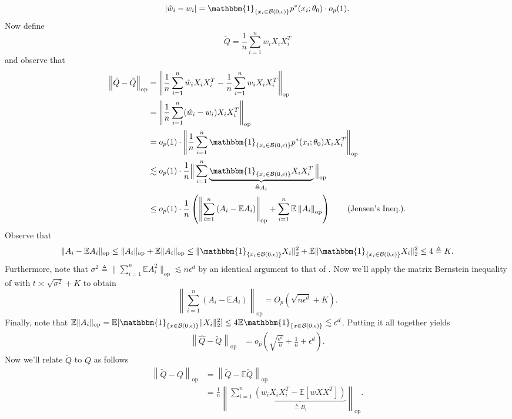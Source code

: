 \documentclass[11pt]{article}
\begin{document}
\begin{equation*}
     |\hat{w}_i - w_i| = \mathbbm{1}_{\{x_i \in \mathcal{B}(0, \epsilon)\}}p^*(x_i;\theta_0) \cdot o_p(1).
\end{equation*}
Now define 
\[\tilde{Q} = \frac{1}{n}\sum_{i = 1}^n w_iX_iX_i^T\]
and observe that 
\begin{align*}
\left\|\hat{Q} - \tilde{Q}\right\|_{\text{op}} &= \left\|\frac{1}{n}\sum_{i = 1}^n\hat{w}_iX_iX_i^T - \frac{1}{n}\sum_{i = 1}^nw_iX_iX_i^T\right\|_{\text{op}} \\
&= \left\|\frac{1}{n}\sum_{i = 1}^n(\hat{w}_i - w_i)X_iX_i^T\right\|_{\text{op}} \\
&= o_p(1) \cdot \left\|\frac{1}{n}\sum_{i = 1}^n\mathbbm{1}_{\{x_i \in \mathcal{B}(0, \epsilon)\}}p^*(x_i;\theta_0)X_iX_i^T\right\|_{\text{op}} \\
&\lesssim  o_p(1) \cdot \frac{1}{n}\Big\|\sum_{i = 1}^n\underbrace{\mathbbm{1}_{\{x_i \in \mathcal{B}(0, \epsilon)\}}X_iX_i^T}_{\triangleq A_i}\Big\|_{\text{op}} \\
&\leq o_p(1) \cdot \frac{1}{n}\left(\left\|\sum_{i = 1}^n\left(A_i - \mathbb{E}A_i\right)\right\|_{\text{op}} + \sum_{i = 1}^n\mathbb{E}\left\|A_i\right\| _{\text{op}}\right)\tag{Jensen's Ineq.} .
\end{align*}
Observe that \[\|A_i - \mathbb{E}A_i\|_{\text{op}} \leq \|A_i\|_{\text{op}} + \mathbb{E}\|A_i\|_{\text{op}} \leq \|\mathbbm{1}_{\{x_i \in \mathcal{B}(0, \epsilon)\}}X_i\|^2_2 + \mathbb{E}\|\mathbbm{1}_{\{x_i \in \mathcal{B}(0, \epsilon)\}}X_i\|_2^2 \leq 4 \triangleq K.\] Furthermore, note that $\sigma^2 \triangleq \|\sum_{i = 1}^n\mathbb{E}A_i^2\|_{\text{op}} \lesssim n\epsilon^d$ by an identical argument to that of . Now we'll apply the matrix Bernstein inequality of  with $t \asymp \sqrt{\sigma^2} + K$ to obtain
\[\left\| \sum_{i = 1}^n \left(A_i - \mathbb{E}A_i\right)\right\|_{\text{op}} = O_p\left(\sqrt{n\epsilon^d}  + K\right).\]
Finally, note that $\mathbb{E}\|A_i\|_{\text{op}} = \mathbb{E}[\mathbbm{1}_{\{x \in \mathcal{B}(0, \epsilon)\}}\|X_i\|_2^2] \leq 4\mathbb{E}\mathbbm{1}_{\{x \in \mathcal{B}(0, \epsilon)\}} \lesssim \epsilon^d$. Putting it all together yields
\begin{align*}
\left\|\hat{Q} - \tilde{Q}\right\|_{\text{op}} &= o_p\left( \sqrt{\frac{\epsilon^d}{n}} + \frac{1}{n} + \epsilon^d \right).
\end{align*}
Now we'll relate $\tilde Q$ to $Q$ as follows
\begin{align*}
    \left\|\tilde{Q} - Q\right\|_{\text{op}} &= \left\|\tilde{Q} - \mathbb{E}\tilde{Q}\right\|_{\text{op}} \\
    &= \frac{1}{n}\left\|\sum_{i = 1}^n\underbrace{\left(w_iX_iX_i^T - \mathbb{E}[wXX^T]\right)}_{\triangleq B_i}\right\|_{\text{op}}.
\end{align*}
\end{document}
